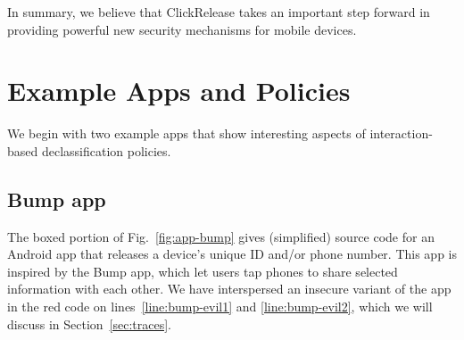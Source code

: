 \documentclass{llncs}
\newcommand{\toolname}{ClickRelease\xspace}
\begin{document}
In summary, we believe that \toolname takes an important step forward
in providing powerful new security mechanisms for mobile devices.



\section{Example Apps and Policies}
\label{sec:overview}

We begin with two example apps that show interesting aspects of
interaction-based declassification
policies.

\subsection{Bump app}

The boxed portion of Fig.~\ref{fig:app-bump} gives (simplified) source
code for an Android app that releases a device's unique ID and/or phone
number. This app is inspired by the Bump app, which let users tap
phones to share selected information with each other.  We have
interspersed an insecure variant of the app in the red code on
lines~\ref{line:bump-evil1} and \ref{line:bump-evil2}, which we will
discuss in Section~\ref{sec:traces}.
\end{document}
